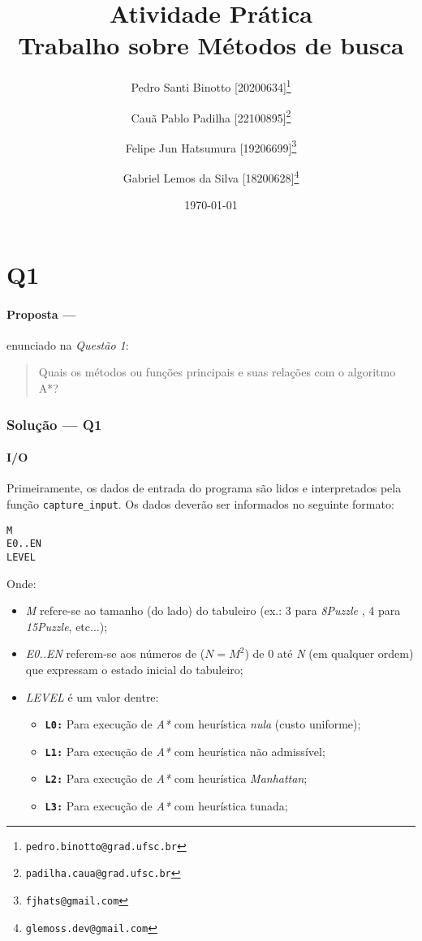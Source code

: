 \documentclass[12pt]{article}
\title{Atividade Prática \RNum{1} \\ [0.2em]\smaller{}Trabalho sobre Métodos de busca}
\author[1]{Pedro Santi Binotto [20200634]\thanks{\texttt{pedro.binotto@grad.ufsc.br}}}
\author[2]{Cauã Pablo Padilha [22100895]\thanks{\texttt{padilha.caua@grad.ufsc.br}}}
\author[3]{Felipe Jun Hatsumura [19206699]\thanks{\texttt{fjhats@gmail.com}}}
\author[4]{Gabriel Lemos da Silva [18200628]\thanks{\texttt{glemoss.dev@gmail.com}}}
\date{\today}
\affil[1]{Departamento de Informática e Estatística, Universidade Federal de Santa Catarina}
\begin{document}
\begin{titlepage}
\maketitle
\thispagestyle{empty}

\end{titlepage}

\tableofcontents

\printglossary[title=Glossário, toctitle=Glossário]

\section{Q1}

\paragraph{Proposta ---} enunciado na \textit{Questão 1}:

\begin{quote}
Quais os métodos ou funções principais e suas relações com o algoritmo A*?
\end{quote}

\subsubsection{Solução --- \textbf{Q1}}

\paragraph{I/O}
Primeiramente, os dados de entrada do programa são lidos e interpretados pela função \texttt{capture\_input}. Os dados deverão ser informados no seguinte formato:

\begin{verbatim}
M
E0..EN
LEVEL
\end{verbatim}

Onde:
\begin{itemize}
  \item \textit{M} refere-se ao tamanho (do lado) do tabuleiro (ex.: 3 para \textit{8Puzzle} , 4 para \textit{15Puzzle}, etc...);
\item \textit{E0..EN} referem-se aos números de ($N = M^2$) de 0 até \textit{N} (em qualquer ordem) que expressam o estado inicial do tabuleiro;
\item \textit{LEVEL} é um valor dentre:
  \begin{itemize}
    \item \textbf{\texttt{L0:}} Para execução de \textit{A*} com heurística \textit{nula} (custo uniforme);
      \item \textbf{\texttt{L1:}} Para execução de \textit{A*} com heurística não admissível;
      \item \textbf{\texttt{L2:}} Para execução de \textit{A*} com heurística \textit{Manhattan\cite{sharma2016}};
      \item \textbf{\texttt{L3:}} Para execução de \textit{A*} com heurística tunada;
  \end{itemize}
\end{itemize}
\end{document}
